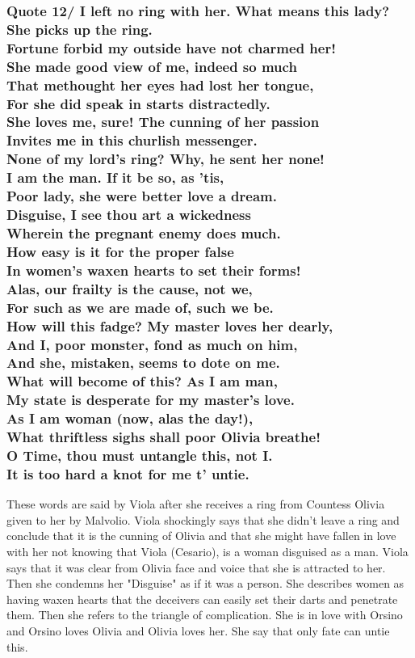\documentclass[12pt, a4paper]{article}
\begin{document}
\subsubsection*{Quote 12/
I left no ring with her. What means this lady?\\
She picks up the ring.\\
Fortune forbid my outside have not charmed her!\\
She made good view of me, indeed so much\\
That methought her eyes had lost her tongue,\\
For she did speak in starts distractedly.\\
She loves me, sure! The cunning of her passion\\
Invites me in this churlish messenger.\\
None of my lord’s ring? Why, he sent her none!\\
I am the man. If it be so, as ’tis,\\
Poor lady, she were better love a dream.\\
Disguise, I see thou art a wickedness\\
Wherein the pregnant enemy does much.\\
How easy is it for the proper false\\
In women’s waxen hearts to set their forms!\\
Alas, our frailty is the cause, not we,\\
For such as we are made of, such we be.\\
How will this fadge? My master loves her dearly,\\
And I, poor monster, fond as much on him,\\
And she, mistaken, seems to dote on me.\\
What will become of this? As I am man,\\
My state is desperate for my master’s love.\\
As I am woman (now, alas the day!),\\
What thriftless sighs shall poor Olivia breathe!\\
O Time, thou must untangle this, not I.\\
It is too hard a knot for me t’ untie.
}

These words are said by Viola after she receives a ring from Countess 
Olivia given to her by Malvolio. Viola shockingly says that she didn't leave 
a ring and conclude that it is the cunning of Olivia and that she 
might have fallen in love with her not knowing that Viola (Cesario),
is a woman disguised as a man. Viola says that it was clear from Olivia 
face and voice that she is attracted to her. Then she condemns her
"Disguise" as if it was a person. She describes women as having waxen
hearts that the deceivers can easily set their darts and penetrate them.
Then she refers to the triangle of complication. She is in love with
Orsino and Orsino loves Olivia and Olivia loves her. She say that 
only fate can untie this.\medbreak
\end{document}
